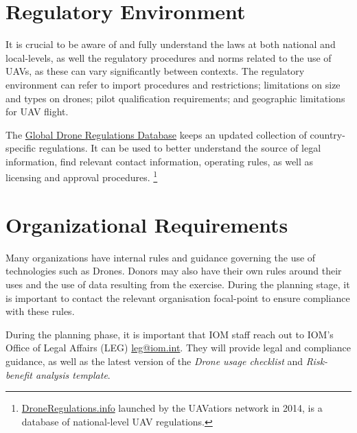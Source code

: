 \documentclass[
  a4paper,
  onecolumn,
  oneside]{book}
\begin{document}
\hypertarget{regulatory-environment}{%
\section{Regulatory Environment}\label{regulatory-environment}}

It is crucial to be aware of and fully understand the laws at both
national and local-levels, as well the regulatory procedures and norms
related to the use of UAVs, as these can vary significantly between
contexts. The regulatory environment can refer to import procedures and
restrictions; limitations on size and types on drones; pilot
qualification requirements; and geographic limitations for UAV flight.

The \href{https://droneregulations.info/}{Global Drone Regulations
Database} keeps an updated collection of country-specific regulations.
It can be used to better understand the source of legal information,
find relevant contact information, operating rules, as well as licensing
and approval procedures. \footnote{\href{https://droneregualtions.info}{DroneRegulations.info}
  launched by the UAVatiors network in 2014, is a database of
  national-level UAV regulations.}

\hypertarget{organizational-requirements}{%
\section{Organizational
Requirements}\label{organizational-requirements}}

Many organizations have internal rules and guidance governing the use of
technologies such as Drones. Donors may also have their own rules around
their uses and the use of data resulting from the exercise. During the
planning stage, it is important to contact the relevant organisation
focal-point to ensure compliance with these rules.

\begin{tcolorbox}[enhanced jigsaw, opacitybacktitle=0.6, colbacktitle=quarto-callout-note-color!10!white, breakable, coltitle=black, title=\textcolor{quarto-callout-note-color}{\faInfo}\hspace{0.5em}{Note for IOM staff}, toprule=.15mm, bottomrule=.15mm, colback=white, left=2mm, toptitle=1mm, bottomtitle=1mm, arc=.35mm, colframe=quarto-callout-note-color-frame, titlerule=0mm, opacityback=0, rightrule=.15mm, leftrule=.75mm]

During the planning phase, it is important that IOM staff reach out to
IOM's Office of Legal Affairs (LEG) \url{leg@iom.int}. They will provide
legal and compliance guidance, as well as the latest version of the
\emph{Drone usage checklist} and \emph{Risk-benefit analysis template}.

\end{tcolorbox}
\end{document}
